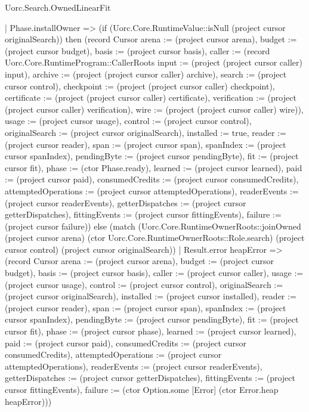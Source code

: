 \begin{lexlean}{Uorc.Search.OwnedLinearFit}
\begin{semanticmodule}
{    | Phase.installOwner => (if (Uorc.Core.RuntimeValue::isNull (project cursor originalSearch)) then (record Cursor {arena := (project cursor arena), budget := (project cursor budget), basis := (project cursor basis), caller := (record Uorc.Core.RuntimeProgram::CallerRoots {input := (project (project cursor caller) input), archive := (project (project cursor caller) archive), search := (project cursor control), checkpoint := (project (project cursor caller) checkpoint), certificate := (project (project cursor caller) certificate), verification := (project (project cursor caller) verification), wire := (project (project cursor caller) wire)}), usage := (project cursor usage), control := (project cursor control), originalSearch := (project cursor originalSearch), installed := true, reader := (project cursor reader), span := (project cursor span), spanIndex := (project cursor spanIndex), pendingByte := (project cursor pendingByte), fit := (project cursor fit), phase := (ctor Phase.ready), learned := (project cursor learned), paid := (project cursor paid), consumedCredits := (project cursor consumedCredits), attemptedOperations := (project cursor attemptedOperations), readerEvents := (project cursor readerEvents), getterDispatches := (project cursor getterDispatches), fittingEvents := (project cursor fittingEvents), failure := (project cursor failure)}) else (match (Uorc.Core.RuntimeOwnerRoots::joinOwned (project cursor arena) (ctor Uorc.Core.RuntimeOwnerRoots::Role.search) (project cursor control) (project cursor originalSearch))
      | Result.error heapError => (record Cursor {arena := (project cursor arena), budget := (project cursor budget), basis := (project cursor basis), caller := (project cursor caller), usage := (project cursor usage), control := (project cursor control), originalSearch := (project cursor originalSearch), installed := (project cursor installed), reader := (project cursor reader), span := (project cursor span), spanIndex := (project cursor spanIndex), pendingByte := (project cursor pendingByte), fit := (project cursor fit), phase := (project cursor phase), learned := (project cursor learned), paid := (project cursor paid), consumedCredits := (project cursor consumedCredits), attemptedOperations := (project cursor attemptedOperations), readerEvents := (project cursor readerEvents), getterDispatches := (project cursor getterDispatches), fittingEvents := (project cursor fittingEvents), failure := (ctor Option.some [Error] (ctor Error.heap heapError))})
}
\end{semanticmodule}
\end{lexlean}
